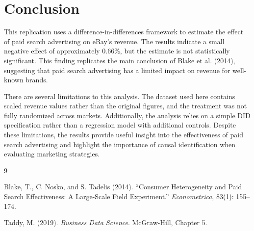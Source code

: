 \documentclass[12pt]{article}
\begin{document}
\section{Conclusion}

This replication uses a difference-in-differences framework to estimate the effect of paid search advertising on eBay's revenue. The results indicate a small negative effect of approximately 0.66\%, but the estimate is not statistically significant. This finding replicates the main conclusion of Blake et al. (2014), suggesting that paid search advertising has a limited impact on revenue for well-known brands.

There are several limitations to this analysis. The dataset used here contains scaled revenue values rather than the original figures, and the treatment was not fully randomized across markets. Additionally, the analysis relies on a simple DID specification rather than a regression model with additional controls. Despite these limitations, the results provide useful insight into the effectiveness of paid search advertising and highlight the importance of causal identification when evaluating marketing strategies.

\begin{thebibliography}{9}

Blake, T., C. Nosko, and S. Tadelis (2014).
``Consumer Heterogeneity and Paid Search Effectiveness: A Large-Scale Field Experiment.''
\textit{Econometrica}, 83(1): 155--174.

Taddy, M. (2019).
\textit{Business Data Science}. McGraw-Hill, Chapter 5.

\end{thebibliography}
\end{document}
